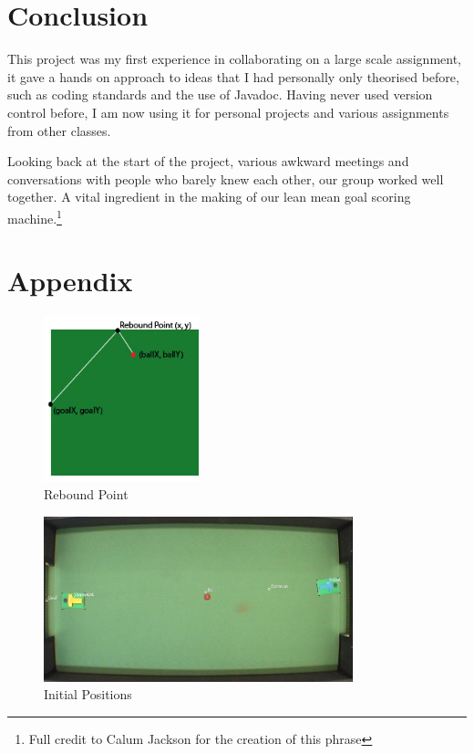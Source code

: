 \documentclass[conference,12pt]{IEEEtran}
\begin{document}
\section{Conclusion}
This project was my first experience in collaborating on a large scale assignment, it gave a hands on approach to ideas that I had personally only theorised before, such as coding standards and the use of Javadoc. Having never used version control before, I am now using it for personal projects and various assignments from other classes.

Looking back at the start of the project, various awkward meetings and conversations with people who barely knew each other, our group worked well together. A vital ingredient in the making of our lean mean goal scoring machine.\footnote{Full credit to Calum Jackson for the creation of this phrase}

\newpage

\section{Appendix}

\begin{figure}[htp]
\begin{center}
\leavevmode
\includegraphics[width=0.4\textwidth] {rebound.jpg}
\end{center}
\caption{Rebound Point}
\label{fig:rebound}
\end{figure}

\begin{figure}[htp]
\begin{center}
\leavevmode
\includegraphics[width=0.8\textwidth] {initial1.jpg}
\end{center}
\caption{Initial Positions}
\label{fig:initial1}
\end{figure}
\end{document}
